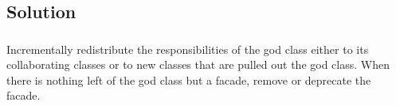 \documentclass{beamer}
\begin{document}
\subsection{Solution}
\begin{frame}
\frametitle{}
Incrementally redistribute the responsibilities of the god class either to its collaborating classes or to new classes that are pulled out the god class. When there is nothing left of the god class but a facade, remove or deprecate the facade.
\end{frame}
\end{document}
